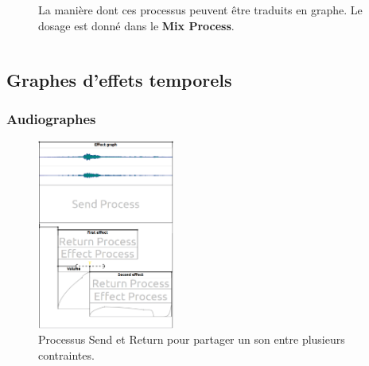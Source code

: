 \documentclass[draft]{beamer}
\begin{document}
\begin{frame}
\begin{columns}
\begin{column}{0.5\textwidth}
\begin{figure}
				\caption{La manière dont ces processus peuvent être traduits en graphe. 
					Le dosage est donné dans le \textbf{Mix Process}.}
			\end{figure}
		\end{column}
	\end{columns}
\end{frame}

\subsection{Graphes d'effets temporels}
\begin{frame}
	\frametitle{Audiographes}    
	\Large
	\begin{figure}
		\centering
		\includegraphics[width=0.4\textwidth]{images/ex3.png}
		\caption{Processus Send et Return pour partager un son entre plusieurs contraintes.}
	\end{figure}
\end{frame}
\end{document}
